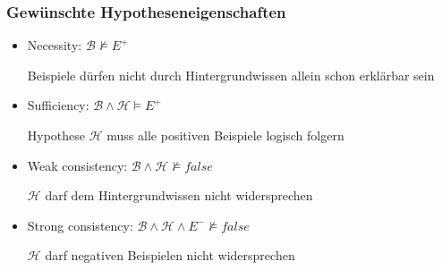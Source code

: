 \begin{frame}
	\frametitle{Gewünschte Hypotheseneigenschaften}
	\begin{itemize}
		\item Necessity:          $\mathcal{B} \nvDash E^{+}$

			Beispiele dürfen nicht durch Hintergrundwissen allein schon erklärbar sein

		\item Sufficiency:        $\mathcal{B} \land \mathcal{H} \vDash E^{+}$

			Hypothese $\mathcal{H}$ muss alle positiven Beispiele logisch folgern

		\item Weak consistency:   $\mathcal{B} \land \mathcal{H} \nvDash false$

			$\mathcal{H}$ darf dem Hintergrundwissen nicht widersprechen

		\item Strong consistency: $\mathcal{B} \land \mathcal{H} \land E^{-} \nvDash false$

			$\mathcal{H}$ darf negativen Beispielen nicht widersprechen
	\end{itemize}
\end{frame}
